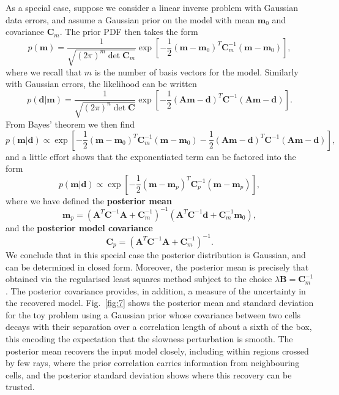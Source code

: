 As a special case, suppose we consider a linear inverse problem with Gaussian data errors, and assume a Gaussian 
prior on the model with mean $\mathbf{m}_{0}$ and covariance $\mathbf{C}_{m}$. The prior PDF then takes the form
\begin{equation}
    p(\mathbf{m}) = \frac{1}{\sqrt{(2\pi)^{m}\det \mathbf{C}_{m}}} \exp\left[-\frac{1}{2}(\mathbf{m}-\mathbf{m}_{0})^{T}
    \mathbf{C}_{m}^{-1}(\mathbf{m}-\mathbf{m}_{0})\right],
    \label{eq:38}
\end{equation}
where we recall that $m$ is the number of basis vectors for the model. Similarly with Gaussian errors, the likelihood can be written
\begin{equation}
    p(\mathbf{d}|\mathbf{m}) = \frac{1}{\sqrt{(2\pi)^{n}\det \mathbf{C}}} \exp\left[-\frac{1}{2}(\mathbf{A}\mathbf{m}
    -\mathbf{d})^{T}\mathbf{C}^{-1}(\mathbf{A}\mathbf{m}-\mathbf{d})\right].
    \label{eq:39}
\end{equation}
From Bayes' theorem we then find
\begin{equation}
    p(\mathbf{m}|\mathbf{d}) \propto \exp\left[-\frac{1}{2}(\mathbf{m}-\mathbf{m}_{0})^{T}\mathbf{C}_{m}^{-1}(\mathbf{m}
    -\mathbf{m}_{0}) - \frac{1}{2}(\mathbf{A}\mathbf{m}-\mathbf{d})^{T}\mathbf{C}^{-1}(\mathbf{A}\mathbf{m}-\mathbf{d})\right],
    \label{eq:40}
\end{equation}
and a little effort shows that the exponentiated term can be factored into the form
\begin{equation}
    p(\mathbf{m}|\mathbf{d}) \propto \exp\left[-\frac{1}{2}(\mathbf{m}-\mathbf{m}_{p})^{T}\mathbf{C}_{p}^{-1}
    (\mathbf{m}-\mathbf{m}_{p})\right],
    \label{eq:41}
\end{equation}
where we have defined the \textbf{posterior mean}
\begin{equation}
    \mathbf{m}_{p} = (\mathbf{A}^{T}\mathbf{C}^{-1}\mathbf{A} + \mathbf{C}_{m}^{-1})^{-1} (\mathbf{A}^{T}
    \mathbf{C}^{-1}\mathbf{d} + \mathbf{C}_{m}^{-1}\mathbf{m}_{0}),
    \label{eq:42}
\end{equation}
and the \textbf{posterior model covariance}
\begin{equation}
    \mathbf{C}_{p} = (\mathbf{A}^{T}\mathbf{C}^{-1}\mathbf{A} + \mathbf{C}_{m}^{-1})^{-1}.
    \label{eq:43}
\end{equation}
We conclude that in this special case the posterior distribution is Gaussian, and can be determined in closed form. 
Moreover, the posterior mean is precisely that obtained via the regularised least squares method subject to the 
choice $\lambda \mathbf{B} = \mathbf{C}_{m}^{-1}$. The posterior covariance provides, in addition, a measure of the 
uncertainty in the recovered model. Fig.~\ref{fig:7} shows the posterior mean and standard deviation for the toy problem 
using a Gaussian prior whose covariance between two cells decays with their separation over a correlation length of 
about a sixth of the box, this encoding the expectation that the slowness perturbation is smooth. The posterior mean 
recovers the input model closely, including within regions crossed by few rays, where the prior correlation carries 
information from neighbouring cells, and the posterior standard deviation shows where this recovery can be trusted.

